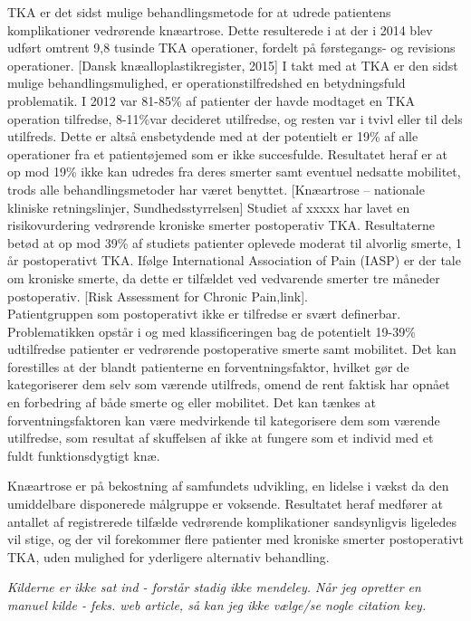 TKA er det sidst mulige behandlingsmetode for at udrede patientens komplikationer vedrørende knæartrose. Dette resulterede i at der i 2014 blev udført omtrent 9,8 tusinde TKA operationer, fordelt på førstegangs- og revisions operationer. [Dansk knæalloplastikregister, 2015] I takt med at TKA er den sidst mulige behandlingsmulighed, er operationstilfredshed en betydningsfuld problematik. I 2012 var 81-85\% af patienter der havde modtaget en TKA operation tilfredse, 8-11\%var decideret utilfredse, og resten var i tvivl eller til dels utilfreds. Dette er altså ensbetydende med at der potentielt er 19\% af alle operationer fra et patientøjemed som er ikke succesfulde. Resultatet heraf er at op mod 19\% ikke kan udredes fra deres smerter samt eventuel nedsatte mobilitet, trods alle behandlingsmetoder har været benyttet. [Knæartrose – nationale kliniske retningslinjer, Sundhedsstyrrelsen] Studiet af xxxxx har lavet en risikovurdering vedrørende kroniske smerter postoperativ TKA. Resultaterne betød at op mod 39\% af studiets patienter oplevede moderat til alvorlig smerte, 1 år postoperativt TKA. Ifølge International Association of Pain (IASP) er der tale om kroniske smerte, da dette er tilfældet ved vedvarende smerter tre måneder postoperativ. [Risk Assessment for Chronic Pain,link]. \\
Patientgruppen som postoperativt ikke er tilfredse er svært definerbar. Problematikken opstår i og med klassificeringen bag de potentielt 19-39\% udtilfredse patienter er vedrørende postoperative smerte samt mobilitet. Det kan forestilles at der blandt patienterne en forventningsfaktor, hvilket gør de kategoriserer dem selv som værende utilfreds, omend de rent faktisk har opnået en forbedring af både smerte og eller mobilitet. Det kan tænkes at forventningsfaktoren kan være medvirkende til kategorisere dem som værende utilfredse, som resultat af skuffelsen af ikke at fungere som et individ med et fuldt funktionsdygtigt knæ.  

Knæartrose er på bekostning af samfundets udvikling, en lidelse i vækst da den umiddelbare disponerede målgruppe er voksende. Resultatet heraf medfører at antallet af registrerede tilfælde vedrørende komplikationer sandsynligvis ligeledes vil stige, og der vil forekommer flere patienter med kroniske smerter postoperativt TKA, uden mulighed for yderligere alternativ behandling.


\textit{Kilderne er ikke sat ind - forstår stadig ikke mendeley. Når jeg opretter en manuel kilde - feks. web article, så kan jeg ikke vælge/se nogle citation key.}

